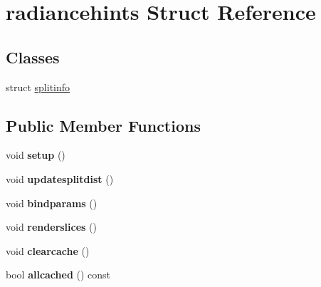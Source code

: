 \hypertarget{structradiancehints}{}\section{radiancehints Struct Reference}
\label{structradiancehints}
\subsection*{Classes}
\begin{DoxyCompactItemize}
\item 
struct \hyperlink{structradiancehints_1_1splitinfo}{splitinfo}
\end{DoxyCompactItemize}
\subsection*{Public Member Functions}
\begin{DoxyCompactItemize}
\item 
\mbox{\label{structradiancehints_a4fd2f3bc721efbab159b28ef2a56aa59}} 
void {\bfseries setup} ()
\item 
\mbox{\label{structradiancehints_a1671dd76692c1c67bc6ca5d00302a271}} 
void {\bfseries updatesplitdist} ()
\item 
\mbox{\label{structradiancehints_aa7e2717ec9a4e029cc3e4bf525ac8122}} 
void {\bfseries bindparams} ()
\item 
\mbox{\label{structradiancehints_a11f1f79339ee8e1f9c91a17243653391}} 
void {\bfseries renderslices} ()
\item 
\mbox{\label{structradiancehints_aac4a239c4c66f78c7ff8eeb8bfaca25d}} 
void {\bfseries clearcache} ()
\item 
\mbox{\label{structradiancehints_af386585446d95f9c12e4d5c9704e012d}} 
bool {\bfseries allcached} () const
\end{DoxyCompactItemize}
